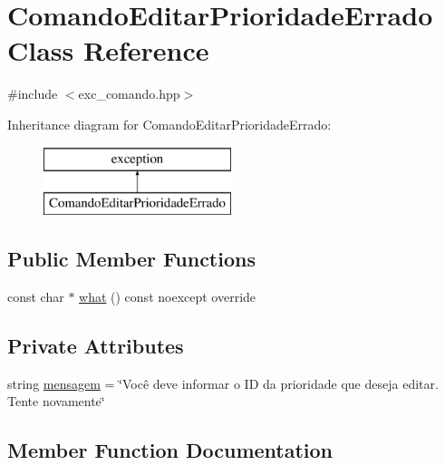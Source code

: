 \hypertarget{classComandoEditarPrioridadeErrado}{}\section{Comando\+Editar\+Prioridade\+Errado Class Reference}
\label{classComandoEditarPrioridadeErrado}


{\ttfamily \#include $<$exc\+\_\+comando.\+hpp$>$}

Inheritance diagram for Comando\+Editar\+Prioridade\+Errado\+:\begin{figure}[H]
\begin{center}
\leavevmode
\includegraphics[height=2.000000cm]{classComandoEditarPrioridadeErrado}
\end{center}
\end{figure}
\subsection*{Public Member Functions}
\begin{DoxyCompactItemize}
\item 
const char $\ast$ \hyperlink{classComandoEditarPrioridadeErrado_a03d338a6103abdc73ce0c8554543c9d9}{what} () const noexcept override
\end{DoxyCompactItemize}
\subsection*{Private Attributes}
\begin{DoxyCompactItemize}
\item 
string \hyperlink{classComandoEditarPrioridadeErrado_a262cdc745b1bfc1d621b657a3c7c39ed}{mensagem} = \char`\"{}Você deve informar o ID da prioridade que deseja editar. Tente novamente\char`\"{}
\end{DoxyCompactItemize}


\subsection{Member Function Documentation}
\mbox{\label{classComandoEditarPrioridadeErrado_a03d338a6103abdc73ce0c8554543c9d9}} 

